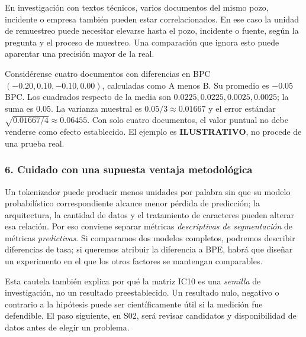 En investigación con textos técnicos, varios documentos del mismo pozo,
incidente o empresa también pueden estar correlacionados. En ese caso la
unidad de remuestreo puede necesitar elevarse hasta el pozo, incidente o
fuente, según la pregunta y el proceso de muestreo. Una comparación que
ignora esto puede aparentar una precisión mayor de la real.

\begin{ejemplo}
Considérense cuatro documentos con diferencias en BPC
$(-0.20,0.10,-0.10,0.00)$, calculadas como A menos B.
Su promedio es $-0.05$ BPC. Los cuadrados respecto de la media son
$0.0225,0.0225,0.0025,0.0025$; la suma es $0.05$.
La varianza muestral es $0.05/3\approx0.01667$ y el error estándar
$\sqrt{0.01667/4}\approx0.06455$. Con solo cuatro documentos,
el valor puntual no debe venderse como efecto establecido. El ejemplo es
\textbf{ILUSTRATIVO}, no procede de una prueba real.
\end{ejemplo}

\subsubsection*{6. Cuidado con una supuesta ventaja metodológica}

Un tokenizador puede producir menos unidades por palabra sin que
su modelo probabilístico correspondiente alcance menor pérdida de
predicción; la arquitectura, la cantidad de datos y el tratamiento
de caracteres pueden alterar esa relación. Por eso conviene separar
métricas \emph{descriptivas de segmentación} de métricas \emph{predictivas}.
Si comparamos dos modelos completos, podremos describir diferencias
de tasa; si queremos atribuir la diferencia a BPE, habrá que diseñar un
experimento en el que los otros factores se mantengan comparables.

Esta cautela también explica por qué la matriz IC10 es una \emph{semilla}
de investigación, no un resultado preestablecido. Un resultado nulo,
negativo o contrario a la hipótesis puede ser científicamente útil si
la medición fue defendible. El paso siguiente, en S02, será revisar
candidatos y disponibilidad de datos antes de elegir un problema.





\label{s01:mod:ej}

